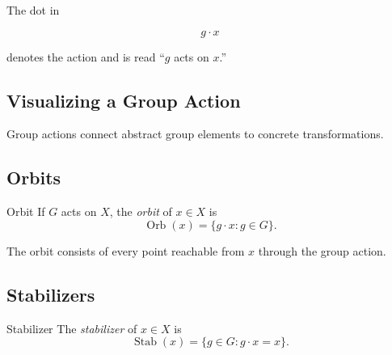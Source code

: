 The dot in

\[ g\cdot x \]

denotes the action and is read ``\(g\) acts on \(x\).''

\subsection{Visualizing a Group Action}
\label{subsec:visual-group-action}

\begin{center}
\end{center}

Group actions connect abstract group elements to concrete transformations.

\subsection{Orbits}
\label{subsec:orbits}

\begin{definitionbox}{Orbit}
If \(G\) acts on \(X\), the \emph{orbit} of \(x\in X\) is
\[ \operatorname{Orb}(x)=\{g\cdot x:g\in G\}. \]
\end{definitionbox}

The orbit consists of every point reachable from \(x\) through the group
action.

\subsection{Stabilizers}
\label{subsec:stabilizers}

\begin{definitionbox}{Stabilizer}
The \emph{stabilizer} of \(x\in X\) is
\[ \operatorname{Stab}(x)=\{g\in G:g\cdot x=x\}. \]
\end{definitionbox}

